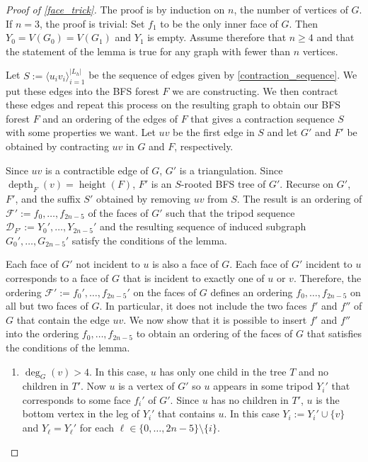 \documentclass{patmorin}
\DeclareMathOperator{\height}{height}
\DeclareMathOperator{\depth}{depth}
\begin{document}

\begin{proof}[Proof of \cref{face_trick}]
  The proof is by induction on $n$, the number of vertices of $G$.  If $n=3$, the proof is trivial: Set $f_1$ to be the only inner face of $G$.  Then $Y_0=V(G_0)= V(G_1)$ and $Y_1$ is empty.  Assume therefore that $n\ge 4$ and that the statement of the lemma is true for any graph with fewer than $n$ vertices.

  Let $S:=\langle u_iv_i\rangle_{i=1}^{|L_h|}$ be the sequence of edges given by \cref{contraction_sequence}.  We put these edges into the BFS forest $F$ we are constructing.  We then contract these edges and repeat this process on the resulting graph to obtain our BFS forest $F$ and an ordering of the edges of $F$ that gives a contraction sequence $S$ with some properties we want.  Let $uv$ be the first edge in $S$ and let $G'$ and $F'$ be obtained by contracting $uv$ in $G$ and $F$, respectively.

  Since $uv$ is a contractible edge of $G$, $G'$ is a triangulation.  Since $\depth_F(v)=\height(F)$, $F'$ is an $S$-rooted BFS tree of $G'$.  Recurse on $G'$, $F'$, and the suffix $S'$ obtained by removing $uv$ from $S$. The result is an ordering of $\mathcal{F}':=f_0,\ldots,f_{2n-5}$ of the faces of $G'$ such that the tripod sequence $\mathcal{D}_{F'}:=Y_0',\ldots,Y_{2n-5}'$ and the resulting sequence of induced subgraph $G_0',\ldots,G_{2n-5}'$ satisfy the conditions of the lemma.

  Each face of $G'$ not incident to $u$ is also a face of $G$.  Each face of $G'$ incident to $u$ corresponds to a face of $G$ that is incident to exactly one of $u$ or $v$.  Therefore, the ordering $\mathcal{F}':=f_0',\ldots,f_{2n-5}'$ on the faces of $G$ defines an ordering $f_0,\ldots,f_{2n-5}$ on all but two faces of $G$.  In particular, it does not include the two faces $f'$ and $f''$ of $G$ that contain the edge $uv$. We now show that it is possible to insert $f'$ and $f''$ into the ordering $f_0,\ldots,f_{2n-5}$ to obtain an ordering of the faces of $G$ that satisfies the conditions of the lemma.

  \begin{enumerate}
    \item $\deg_G(v)>4$.  In this case, $u$ has only one child in the tree $T$ and no children in $T'$.  Now $u$ is a vertex of $G'$ so $u$ appears in some tripod $Y_i'$ that corresponds to some face $f_i'$ of $G'$.  Since $u$ has no children in $T'$, $u$ is the bottom vertex in the leg of $Y_i'$ that contains $u$.  In this case $Y_i:=Y_{i}'\cup\{v\}$ and $Y_{\ell}=Y_\ell'$ for each $\ell\in\{0,\ldots,2n-5\}\setminus\{i\}$.


\end{enumerate}
\end{proof}
\end{document}
